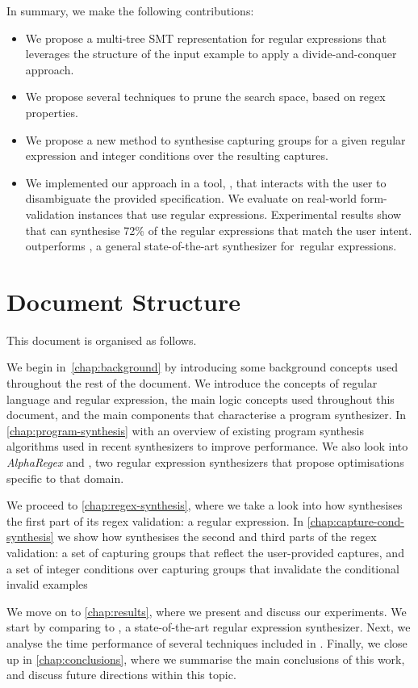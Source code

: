 In summary, we make the following contributions:

\begin{itemize}
    \item We propose a multi-tree SMT representation for regular expressions that leverages the structure of the input example to apply a divide-and-conquer approach.
    
    \item We propose several techniques to prune the search space, based on regex properties.
    
    \item We propose a new method to synthesise capturing groups for a given regular expression and integer conditions over the resulting captures.
    
    \item We implemented our approach in a tool, \Forest{}, that interacts with the user to disambiguate the provided specification. We evaluate \Forest{} on real-world form-validation instances that use regular expressions. Experimental results show that \Forest can synthesise 72\% of the regular expressions that match the user intent.  \Forest{} outperforms \Regel, a general state-of-the-art synthesizer for~regular expressions.
\end{itemize}

\section{Document Structure}

This document is organised as follows.

We begin in~\autoref{chap:background} by introducing some background concepts used throughout the rest of the document. We introduce the concepts of regular language and regular expression, the main logic concepts used throughout this document, and the main components that characterise a program synthesizer.
%
In \autoref{chap:program-synthesis} with an overview of existing program synthesis algorithms used in recent synthesizers to improve performance.
%
We also look into \textit{AlphaRegex} and \Regel, two regular expression synthesizers that propose optimisations specific to that domain.

We proceed to \autoref{chap:regex-synthesis}, where we take a look into how \Forest synthesises the first part of its regex validation: a regular expression.
%
In \autoref{chap:capture-cond-synthesis} we show how \Forest synthesises the second and third parts of the regex validation: a set of capturing groups that reflect the user-provided captures, and a set of integer conditions over capturing groups that invalidate the conditional invalid examples

We move on to \autoref{chap:results}, where we present and discuss our experiments. We start by comparing \Forest to \Regel, a state-of-the-art regular expression synthesizer. Next, we analyse the time performance of several techniques included in \Forest.
%
Finally, we close up in \autoref{chap:conclusions}, where we summarise the main conclusions of this work, and discuss future directions within this topic.

